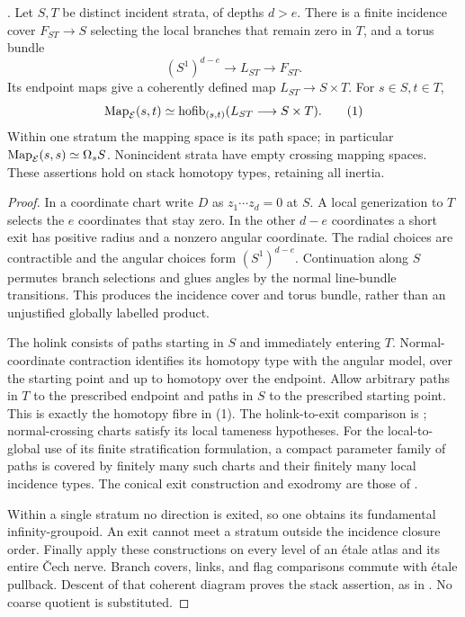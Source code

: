 \begin{theorem}\label{P1a1}
.
Let $S,T$ be distinct incident strata, of depths $d>e$.
There is a finite incidence cover $F_{ST}\to S$ selecting the local
branches that remain zero in $T$, and a torus bundle
\[
 (S^1)^{d-e}\longrightarrow L_{ST}\longrightarrow F_{ST}.
\]
Its endpoint maps give a coherently defined map $L_{ST}\to S\times T$.
For $s\in S,t\in T$,
\[
 \operatorname{Map}_{\mathcal E}(s,t)\simeq
 \operatorname{hofib}_{(s,t)}(L_{ST}\longrightarrow S\times T). \tag{1}
\]
Within one stratum the mapping space is its path space; in particular
$\operatorname{Map}_{\mathcal E}(s,s)\simeq\Omega_sS$.
Nonincident strata have empty crossing mapping spaces.
These assertions hold on stack homotopy types, retaining all inertia.
\end{theorem}
\begin{proof}
In a coordinate chart write $D$ as $z_1\cdots z_d=0$ at $S$.
A local generization to $T$ selects the $e$ coordinates that stay zero.
In the other $d-e$ coordinates a short exit has positive radius and a
nonzero angular coordinate. The radial choices are contractible and
the angular choices form $(S^1)^{d-e}$. Continuation along $S$
permutes branch selections and glues angles by the normal line-bundle
transitions. This produces the incidence cover and torus bundle,
rather than an unjustified globally labelled product.

The holink consists of paths starting in $S$ and immediately entering
$T$. Normal-coordinate contraction identifies its homotopy type with
the angular model, over the starting point and up to homotopy over
the endpoint. Allow arbitrary paths in $T$ to the prescribed endpoint
and paths in $S$ to the prescribed starting point. This is exactly
the homotopy fibre in (1). The holink-to-exit comparison is
\citet[Theorem 4.9]{Miller2009}; normal-crossing charts satisfy its
local tameness hypotheses. For the local-to-global use of its finite
stratification formulation, a compact parameter family of paths is
covered by finitely many such charts and their finitely many local
incidence types. The conical exit construction and
exodromy are those of \citet[Appendix A.9]{LurieHA2017}.

Within a single stratum no direction is exited, so one obtains its
fundamental infinity-groupoid. An exit cannot meet a stratum outside
the incidence closure order. Finally apply these constructions on
every level of an étale atlas and its entire Čech nerve. Branch
covers, links, and flag comparisons commute with étale pullback.
Descent of that coherent diagram proves the stack assertion, as in
\citet[Proposition 3.16 and Corollary 3.17]{JansenToolbox2024}.
No coarse quotient is substituted.
\end{proof}

